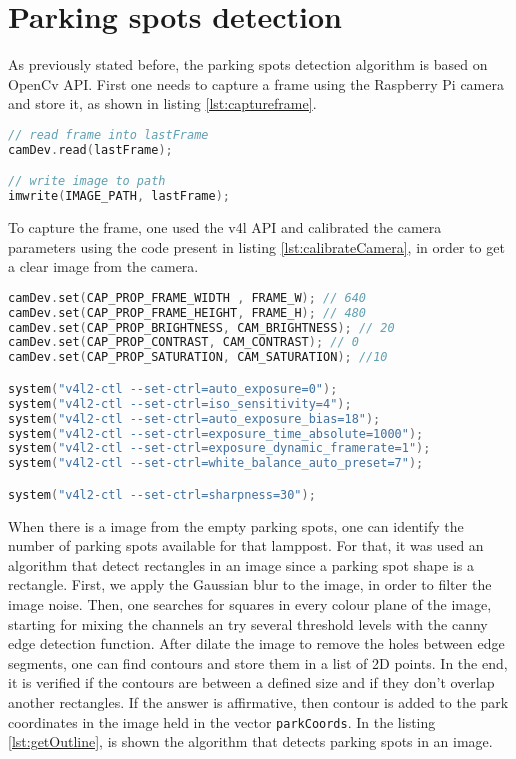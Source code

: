 \section{Parking spots detection}
As previously stated before, the parking spots detection algorithm is based on OpenCv API. First one needs to capture a frame using the Raspberry Pi camera and store it, as shown in listing \ref{lst:captureframe}. 

\begin{lstlisting}[language=C, caption={Capture and Store frame from Camera.}, label={lst:captureframe}]
// read frame into lastFrame
camDev.read(lastFrame);

// write image to path
imwrite(IMAGE_PATH, lastFrame);
\end{lstlisting}

To capture the frame, one used the \ac{v4l} API and calibrated the camera parameters using the code present in listing \ref{lst:calibrateCamera}, in order to get a clear image from the camera. 

\begin{lstlisting}[language=C, caption={Capture and Store frame from Camera.}, label={lst:captureframe}]
camDev.set(CAP_PROP_FRAME_WIDTH , FRAME_W); // 640
camDev.set(CAP_PROP_FRAME_HEIGHT, FRAME_H); // 480
camDev.set(CAP_PROP_BRIGHTNESS, CAM_BRIGHTNESS); // 20
camDev.set(CAP_PROP_CONTRAST, CAM_CONTRAST); // 0
camDev.set(CAP_PROP_SATURATION, CAM_SATURATION); //10

system("v4l2-ctl --set-ctrl=auto_exposure=0");
system("v4l2-ctl --set-ctrl=iso_sensitivity=4");
system("v4l2-ctl --set-ctrl=auto_exposure_bias=18");
system("v4l2-ctl --set-ctrl=exposure_time_absolute=1000");
system("v4l2-ctl --set-ctrl=exposure_dynamic_framerate=1");
system("v4l2-ctl --set-ctrl=white_balance_auto_preset=7");

system("v4l2-ctl --set-ctrl=sharpness=30");
\end{lstlisting}

When there is a image from the empty parking spots, one can identify the number of parking spots available for that lamppost. For that, it was used an algorithm that detect rectangles in an image since a parking spot shape is a rectangle. First, we apply the Gaussian blur to the image, in order to filter the image noise. Then, one searches for squares in every colour plane of the image, starting for mixing the channels an try several threshold levels with the canny edge detection function. After dilate the image to remove the holes between edge segments, one can find contours and store them in a list of 2D points. In the end, it is verified if the contours are between a defined size and if they don't overlap another rectangles. If the answer is affirmative, then contour is added to the park coordinates in the image held in the vector \verb|parkCoords|. In the listing \ref{lst:getOutline}, is shown the algorithm that detects parking spots in an image.

